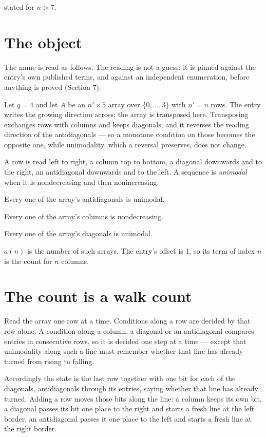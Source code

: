 \documentclass[11pt]{article}
\theoremstyle{definition}
\begin{document}
stated for $n > 7$.

\section{The object}

The name is read as follows. The reading is not a guess: it is pinned against the entry's own published terms, and against an independent enumeration, before anything is proved (Section 7).

Let $q = 4$ and let $A$ be an $n' \times 5$ array over $\{0,\dots,3\}$ with $n' = n$ rows. The entry writes the growing direction across; the array is transposed here. Transposing exchanges rows with columns and keeps diagonals, and it reverses the reading direction of the antidiagonals --- so a monotone condition on those becomes the opposite one, while unimodality, which a reversal preserves, does not change.

A row is read left to right, a column top to bottom, a diagonal downwards and to the right, an antidiagonal downwards and to the left. A sequence is {\itshape unimodal} when it is nondecreasing and then nonincreasing.

Every one of the array's antidiagonals is unimodal.

Every one of the array's columns is nondecreasing.

Every one of the array's diagonals is unimodal.

$a(n)$ is the number of such arrays. The entry's offset is 1, so its term of index $n$ is the count for $n$ columns.

\section{The count is a walk count}

Read the array one row at a time. Conditions along a row are decided by that row alone. A condition along a column, a diagonal or an antidiagonal compares entries in consecutive rows, so it is decided one step at a time --- except that unimodality along such a line must remember whether that line has already turned from rising to falling.

Accordingly the state is the last row together with one bit for each of the diagonals, antidiagonals through its entries, saying whether that line has already turned. Adding a row moves those bits along the line: a column keeps its own bit, a diagonal passes its bit one place to the right and starts a fresh line at the left border, an antidiagonal passes it one place to the left and starts a fresh line at the right border.
\end{document}
